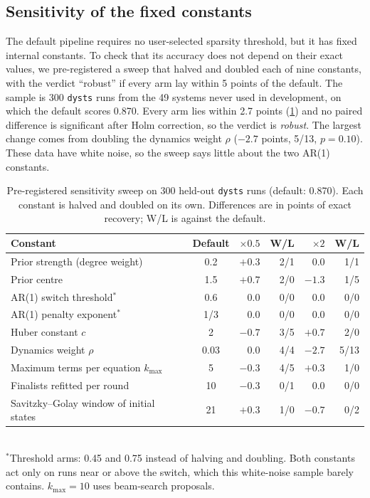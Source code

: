 \subsection{Sensitivity of the fixed constants}
\label{sec:sensitivity}
The default pipeline requires no user-selected sparsity threshold, but it has fixed internal constants. To check that its accuracy does not depend on their exact values, we pre-registered a sweep that halved and doubled each of nine constants, with the verdict ``robust'' if every arm lay within 5 points of the default. The sample is 300 \texttt{dysts} runs from the 49 systems never used in development, on which the default scores 0.870. Every arm lies within 2.7 points (\cref{tab:sensitivity}) and no paired difference is significant after Holm correction, so the verdict is \emph{robust}. The largest change comes from doubling the dynamics weight $\rho$ ($-2.7$ points, 5/13, $p=0.10$). These data have white noise, so the sweep says little about the two AR(1) constants.

\begin{table}[t]
\centering
\caption{Pre-registered sensitivity sweep on 300 held-out \texttt{dysts} runs (default: 0.870). Each constant is halved and doubled on its own. Differences are in points of exact recovery; W/L is against the default.}
\label{tab:sensitivity}
\small
\begin{tabular}{@{}lcrrrr@{}}
\toprule
Constant & Default & $\times0.5$ & W/L & $\times2$ & W/L \\
\midrule
Prior strength (degree weight) & 0.2 & $+0.3$ & 2/1 & $0.0$ & 1/1 \\
Prior centre & 1.5 & $+0.7$ & 2/0 & $-1.3$ & 1/5 \\
AR(1) switch threshold$^*$ & 0.6 & $0.0$ & 0/0 & $0.0$ & 0/0 \\
AR(1) penalty exponent$^*$ & 1/3 & $0.0$ & 0/0 & $0.0$ & 0/0 \\
Huber constant $c$ & 2 & $-0.7$ & 3/5 & $+0.7$ & 2/0 \\
Dynamics weight $\rho$ & 0.03 & $0.0$ & 4/4 & $-2.7$ & 5/13 \\
Maximum terms per equation $k_{\max}$ & 5 & $-0.3$ & 4/5 & $+0.3$ & 1/0 \\
Finalists refitted per round & 10 & $-0.3$ & 0/1 & $0.0$ & 0/0 \\
Savitzky--Golay window of initial states & 21 & $+0.3$ & 1/0 & $-0.7$ & 0/2 \\
\bottomrule
\end{tabular}
\\[2pt]{\footnotesize $^*$Threshold arms: 0.45 and 0.75 instead of halving and doubling. Both constants act only on runs near or above the switch, which this white-noise sample barely contains. $k_{\max}=10$ uses beam-search proposals.}
\end{table}


